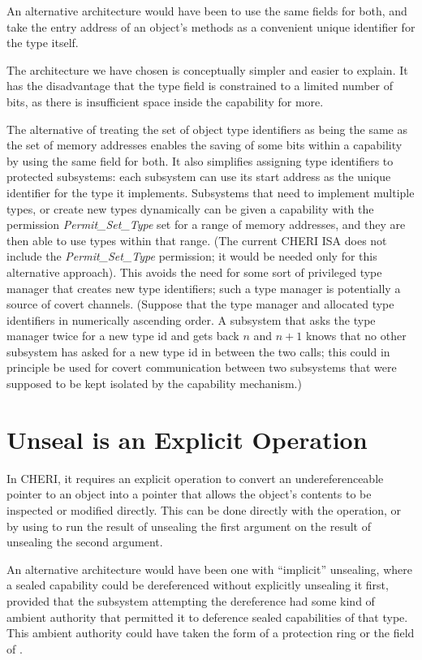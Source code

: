 An alternative architecture would have been to use the same fields for
both, and take the entry address of an object's methods as a convenient
unique identifier for the type itself.

The architecture we have chosen is conceptually simpler and easier to
explain. It has the disadvantage that the type field is constrained to
a limited number of bits, as there is insufficient space inside the
capability for more.

The alternative of treating the set of object type identifiers as being the
same as the set of memory addresses enables the saving of some bits within
a capability by using the same field for both.
It also simplifies
assigning type identifiers to protected subsystems: each subsystem can
use its start address as the unique identifier for the type it implements.
Subsystems that need to implement multiple types, or create new types
dynamically can be given a capability with the permission
\emph{Permit\_Set\_Type} set for a
range of memory addresses, and they are then able to use types within that
range. (The current CHERI ISA does not include the
\emph{Permit\_Set\_Type} permission;
it would be needed only for this alternative approach). This avoids the need
for some sort of privileged type manager that
creates new type identifiers; such a type manager is potentially a source
of covert channels. (Suppose that the type manager and allocated
type identifiers in numerically ascending order. A subsystem that asks the
type manager twice for a new type id and gets back $n$ and $n+1$ knows that no
other subsystem has asked for a new type id in between the two calls; this
could in principle be used for covert communication between two subsystems
that were supposed to be kept isolated by the capability mechanism.)

\section{Unseal is an Explicit Operation}

In CHERI, it requires an explicit operation to
convert an undereferenceable  pointer to an object into a pointer that
allows the object's contents to be inspected or modified directly.
This can be done directly with the  operation,
or by using  to run the result of unsealing the first
argument on the result of unsealing the second argument.

An alternative architecture would have been one with ``implicit'' unsealing,
where a sealed capability could be dereferenced without
explicitly unsealing it first, provided that the subsystem attempting the
dereference had some kind of ambient authority that permitted it to deference
sealed capabilities of that type. This ambient authority could have taken
the form of a protection ring or the \cotype{} field of \PCC{}.

